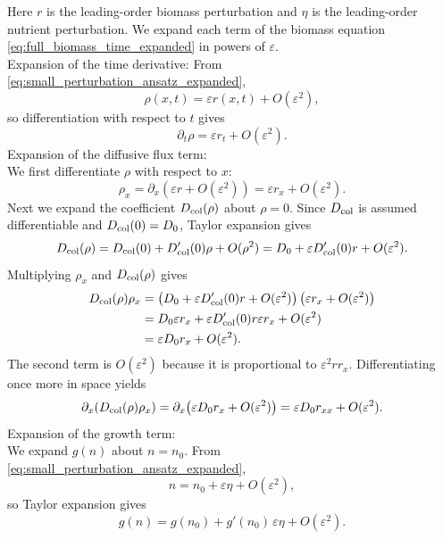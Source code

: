 \documentclass[11pt,a4paper]{report}
\begin{document}
	Here $r$ is the leading-order biomass perturbation and $\eta$ is the leading-order nutrient perturbation.
	We expand each term of the biomass equation \eqref{eq:full_biomass_time_expanded} in powers of $\varepsilon$.\\
	Expansion of the time derivative:
	From \eqref{eq:small_perturbation_ansatz_expanded},
	\[
	\rho(x,t)=\varepsilon r(x,t)+O(\varepsilon^2),
	\]
	so differentiation with respect to $t$ gives
	\begin{equation}
		\partial_t \rho
		=
		\varepsilon r_t+O(\varepsilon^2).
		\label{eq:rho_t_expansion_expanded}
	\end{equation}
	Expansion of the diffusive flux term:\\
	We first differentiate $\rho$ with respect to $x$:
	\[
	\rho_x
	=
	\partial_x\!\left(\varepsilon r+O(\varepsilon^2)\right)
	=
	\varepsilon r_x+O(\varepsilon^2).
	\]
	Next we expand the coefficient $D_{\rm col}(\rho)$ about $\rho=0$.  Since $D_{\rm col}$ is assumed differentiable and $D_{\rm col}(0)=D_0$, Taylor expansion gives
	\begin{equation}
		D_{\rm col}(\rho)
		=
		D_{\rm col}(0)
		+
		D_{\rm col}'(0)\rho
		+
		O(\rho^2)
		=
		D_0+\varepsilon D_{\rm col}'(0)r+O(\varepsilon^2).
		\label{eq:Dcol_taylor_expanded}
	\end{equation}
	Multiplying $\rho_x$ and $D_{\rm col}(\rho)$ gives
	\begin{align}
		D_{\rm col}(\rho)\rho_x
		&=
		\left(D_0+\varepsilon D_{\rm col}'(0)r+O(\varepsilon^2)\right)
		\left(\varepsilon r_x+O(\varepsilon^2)\right)
		\\
		&=
		D_0 \varepsilon r_x
		+
		\varepsilon D_{\rm col}'(0)r \varepsilon r_x
		+
		O(\varepsilon^2)
		\\
		&=
		\varepsilon D_0 r_x
		+
		O(\varepsilon^2).
	\end{align}
	The second term is $O(\varepsilon^2)$ because it is proportional to $\varepsilon^2 r r_x$.  Differentiating once more in space yields
	\begin{equation}
		\partial_x\!\left(D_{\rm col}(\rho)\rho_x\right)
		=
		\partial_x\!\left(\varepsilon D_0 r_x+O(\varepsilon^2)\right)
		=
		\varepsilon D_0 r_{xx}+O(\varepsilon^2).
		\label{eq:diffusion_expansion_expanded}
	\end{equation}
	Expansion of the growth term:\\
	We expand $g(n)$ about $n=n_0$.  From \eqref{eq:small_perturbation_ansatz_expanded},
	\[
	n=n_0+\varepsilon \eta+O(\varepsilon^2),
	\]
	so Taylor expansion gives
	\begin{equation}
		g(n)
		=
		g(n_0)
		+
		g'(n_0)\,\varepsilon \eta
		+
		O(\varepsilon^2).
		\label{eq:g_taylor_expanded}
	\end{equation}
\end{document}
